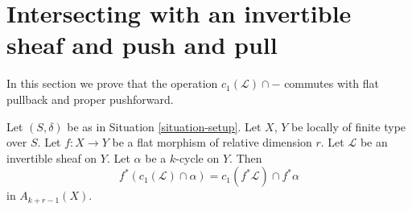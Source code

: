 \section{Intersecting with an invertible sheaf and push and pull}
\label{section-intersecting-with-divisors-push-pull}

\noindent
In this section we prove that the operation $c_1(\mathcal{L}) \cap -$
commutes with flat pullback and proper pushforward.

\begin{lemma}
\label{lemma-flat-pullback-cap-c1}
Let $(S, \delta)$ be as in Situation \ref{situation-setup}.
Let $X$, $Y$ be locally of finite type over $S$.
Let $f : X \to Y$ be a flat morphism of relative dimension $r$.
Let $\mathcal{L}$ be an invertible sheaf on $Y$.
Let $\alpha$ be a $k$-cycle on $Y$.
Then
$$
f^*(c_1(\mathcal{L}) \cap \alpha) = c_1(f^*\mathcal{L}) \cap f^*\alpha
$$
in $A_{k + r - 1}(X)$.
\end{lemma}

